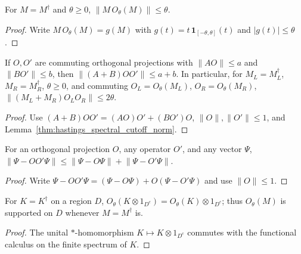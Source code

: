 \begin{lemma}
    \label{thm:hastings_spectral_cutoff_norm}
    \leanok
    For $M=M^\dagger$ and $\theta\ge0$, $\lVert M\,O_\theta(M)\rVert\le\theta$.
\end{lemma}
\begin{proof}\leanok
    Write $M\,O_\theta(M)=g(M)$ with $g(t)=t\,\mathbf 1_{[-\theta,\theta]}(t)$
    and $\lvert g(t)\rvert\le\theta$.
\end{proof}

\begin{lemma}
    \label{thm:hastings_spectral_cutoff_pair_norm}
    \leanok
    If $O,O'$ are commuting orthogonal projections with $\lVert AO\rVert\le a$
    and $\lVert BO'\rVert\le b$, then $\lVert(A+B)OO'\rVert\le a+b$. In
    particular, for $M_L=M_L^\dagger$, $M_R=M_R^\dagger$, $\theta\ge0$, and
    commuting $O_L=O_\theta(M_L)$, $O_R=O_\theta(M_R)$,
    $\lVert(M_L+M_R)O_LO_R\rVert\le2\theta$.
\end{lemma}
\begin{proof}\leanok
    Use $(A+B)OO'=(AO)O'+(BO')O$, $\lVert O\rVert,\lVert O'\rVert\le1$, and
    Lemma~\ref{thm:hastings_spectral_cutoff_norm}.
\end{proof}

\begin{lemma}
    \label{thm:hastings_spectral_cutoff_two}
    \leanok
    For an orthogonal projection $O$, any operator $O'$, and any vector $\Psi$,
    $\lVert\Psi-OO'\Psi\rVert\le\lVert\Psi-O\Psi\rVert+\lVert\Psi-O'\Psi\rVert$.
\end{lemma}
\begin{proof}\leanok
    Write $\Psi-OO'\Psi=(\Psi-O\Psi)+O(\Psi-O'\Psi)$ and use $\lVert O\rVert\le1$.
\end{proof}

\begin{lemma}
    \label{thm:hastings_spectral_cutoff_support}
    \leanok
    For $K=K^\dagger$ on a region $D$, $O_\theta(K\otimes1_{D^c})=O_\theta(K)\otimes1_{D^c}$;
    thus $O_\theta(M)$ is supported on $D$ whenever $M=M^\dagger$ is.
\end{lemma}
\begin{proof}\leanok
    The unital $*$-homomorphism $K\mapsto K\otimes1_{D^c}$ commutes with the
    functional calculus on the finite spectrum of $K$.
\end{proof}

